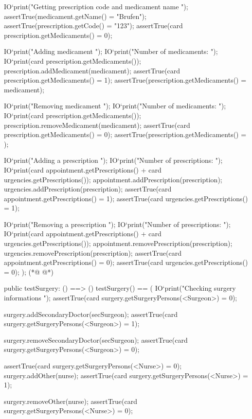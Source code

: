 \begin{vdmpp}[breaklines=true]
   IO`print("\n\n Getting prescription code and medicament name \n");
   assertTrue(medicament.getName() = "Brufen");
   assertTrue(prescription.getCode() = "123");
   assertTrue(card prescription.getMedicaments() = 0);
   
   IO`print("\n Adding medicament \n");
   IO`print("\n Number of medicaments: ");
   IO`print(card prescription.getMedicaments());
   prescription.addMedicament(medicament);
   assertTrue(card prescription.getMedicaments() = 1);
   assertTrue(prescription.getMedicaments() = {medicament});
   
   IO`print("\n\n Removing medicament \n");
   IO`print("\n Number of medicaments: ");
   IO`print(card prescription.getMedicaments());
   prescription.removeMedicament(medicament);
   assertTrue(card prescription.getMedicaments() = 0);
   assertTrue(prescription.getMedicaments() = {});
   
   IO`print("\n Adding a prescription \n");
   IO`print("\n Number of prescriptions: ");
   IO`print(card appointment.getPrescriptions() + card urgencies.getPrescriptions());
   appointment.addPrescription(prescription);
   urgencies.addPrescription(prescription);
   assertTrue(card appointment.getPrescriptions() = 1);
   assertTrue(card urgencies.getPrescriptions() = 1);
   
   IO`print("\n\n Removing a prescription \n");
   IO`print("\n Number of prescriptions: ");
   IO`print(card appointment.getPrescriptions() + card urgencies.getPrescriptions());
   appointment.removePrescription(prescription);
   urgencies.removePrescription(prescription);
   assertTrue(card appointment.getPrescriptions() = 0);
   assertTrue(card urgencies.getPrescriptions() = 0);
  );
(*@
\label{testSurgery:224}
@*)
  
 public testSurgery: () ==> ()
  testSurgery() == (
   IO`print("\n Checking surgery informations \n");
   assertTrue(card surgery.getSurgeryPersons(<Surgeon>) = 0);
   
   surgery.addSecondaryDoctor(secSurgeon);
   assertTrue(card surgery.getSurgeryPersons(<Surgeon>) = 1);
  
   surgery.removeSecondaryDoctor(secSurgeon);
   assertTrue(card surgery.getSurgeryPersons(<Surgeon>) = 0);
   
   assertTrue(card surgery.getSurgeryPersons(<Nurse>) = 0);
   surgery.addOther(nurse);
   assertTrue(card surgery.getSurgeryPersons(<Nurse>) = 1);
   
   surgery.removeOther(nurse);
   assertTrue(card surgery.getSurgeryPersons(<Nurse>) = 0);
   

\end{vdmpp}
